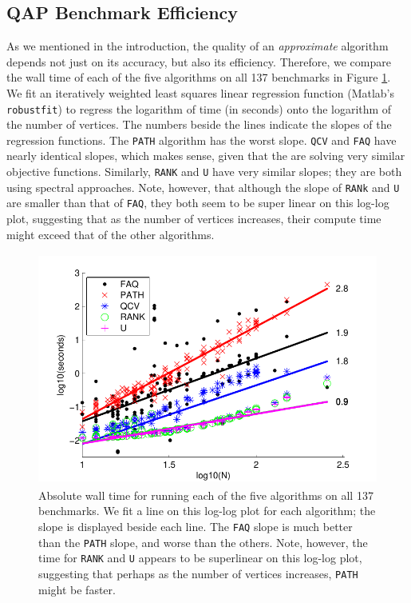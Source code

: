 \documentclass[11pt]{article}
\newcommand{\FAQ}{\texttt{FAQ} }
\begin{document}

\subsection{QAP Benchmark Efficiency} %
\label{sub:subsection_name}

As we mentioned in the introduction, the quality of an \emph{approximate} algorithm depends not just on its accuracy, but also its efficiency.  Therefore, we compare the wall time of each of the five algorithms on all 137 benchmarks in Figure \ref{fig:allEfficiency}.  We fit an iteratively weighted least squares linear regression function (Matlab's \texttt{robustfit}) to regress the logarithm of time (in seconds) onto the logarithm of the number of vertices.  The numbers beside the lines indicate the slopes of the regression functions.  The \texttt{PATH} algorithm has the worst slope.  \texttt{QCV} and \FAQ have nearly identical slopes, which makes sense, given that the are solving very similar objective functions.  Similarly, \texttt{RANK} and \texttt{U} have very similar slopes; they are both using spectral approaches.  Note, however, that although the slope of \texttt{RANk} and \texttt{U} are smaller than that of \texttt{FAQ}, they both seem to be super linear on this log-log plot, suggesting that as the number of vertices increases, their compute time might exceed that of the other algorithms.  

\begin{figure}[htbp]
	\centering
		\includegraphics[height=3in]{allEfficiency.pdf}
	\caption{Absolute wall time for running each of the five algorithms on all 137 benchmarks. We fit a line on this log-log plot for each algorithm; the slope is displayed beside each line. The \FAQ slope is much better than the \texttt{PATH} slope, and worse than the others.  Note, however, the time for \texttt{RANK} and \texttt{U} appears to be superlinear on this log-log plot, suggesting that perhaps as the number of vertices increases, \texttt{PATH} might be faster. }
	\label{fig:allEfficiency}
\end{figure}
\end{document}
